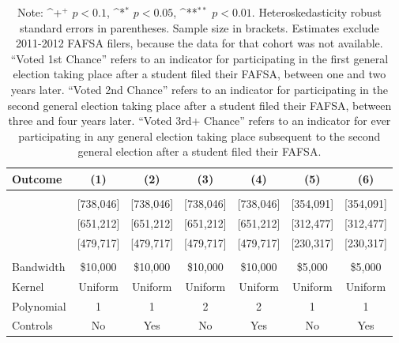 \documentclass[12pt,letterpaper,oneside]{book}
\newcommand{\basepath}{g:/My Drive/Grad School}
\newcommand{\basepath}{basepath}
\begin{document}
\begin{table}[h!]\centering
    \def\sym#1{\ifmmode^{#1}\else\(^{#1}\)\fi}
    \caption{Estimated Impacts of 2010-2019 Cal Grant Receipt on Voter Turnout\label{tab:results3}}
    \begin{tabular}{l*{6}{c}}
        \hline\hline
        Outcome&\multicolumn{1}{c}{(1)}&\multicolumn{1}{c}{(2)}&\multicolumn{1}{c}{(3)}&\multicolumn{1}{c}{(4)}&\multicolumn{1}{c}{(5)}&\multicolumn{1}{c}{(6)}\\
        \hline
        &&&&&&\\
        
        &   [738,046]     &    [738,046]      &      [738,046]    &   [738,046]    &   [354,091]       &   [354,091]        \\[0.5em]
        
        &   [651,212]     &    [651,212]      &      [651,212]    &   [651,212]    &   [312,477]       &   [312,477]        \\[0.5em]
        
        &   [479,717]     &    [479,717]      &      [479,717]    &   [479,717]    &   [230,317]       &   [230,317]        \\

        &&&&&&\\

        \hline
        Bandwidth & \$10,000       &   \$10,000        &   \$10,000        &   \$10,000       &   \$5,000        &   \$5,000        \\
        Kernel&   Uniform      &   Uniform        &   Uniform        &   Uniform       &   Uniform       &   Uniform       \\
        Polynomial&   1       &   1        &   2        &   2       &   1       &   1       \\
        Controls&   No       &   Yes        &   No        &   Yes        &   No        &   Yes        \\
        \hline
    \end{tabular}
    \caption*{\footnotesize Note: \sym{+} \(p<0.1\), \sym{*} \(p<0.05\), \sym{**} \(p<0.01\). Heteroskedasticity robust standard errors in parentheses. Sample size in brackets. Estimates exclude 2011-2012 FAFSA filers, because the data for that cohort was not available. ``Voted 1st Chance'' refers to an indicator for participating in the first general election taking place after a student filed their FAFSA, between one and two years later. ``Voted 2nd Chance'' refers to an indicator for participating in the second general election taking place after a student filed their FAFSA, between three and four years later. ``Voted 3rd+ Chance'' refers to an indicator for ever participating in any general election taking place subsequent to the second general election after a student filed their FAFSA.}
\end{table}
\end{document}
